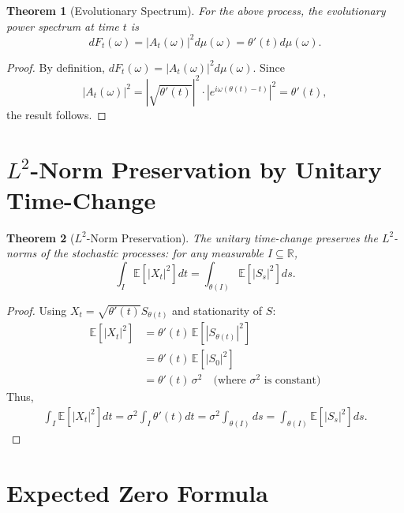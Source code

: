 \documentclass[11pt]{article}
\newtheorem{theorem}{Theorem}
\begin{document}
\begin{theorem}[Evolutionary Spectrum]\label{thm:evolve}
For the above process, the evolutionary power spectrum at time $t$ is
\begin{equation}
    dF_t(\omega) = |A_t(\omega)|^2 d\mu(\omega) = \theta'(t) d\mu(\omega).
\end{equation}
\end{theorem}

\begin{proof}
By definition, $dF_t(\omega) = |A_t(\omega)|^2 d\mu(\omega)$. Since 
\[
|A_t(\omega)|^2 = |\sqrt{\theta'(t)}|^2 \cdot |e^{i\omega(\theta(t)-t)}|^2 = \theta'(t),
\]
the result follows.
\end{proof}

\section{\texorpdfstring{$L^2$}{L2}-Norm Preservation by Unitary Time-Change}

\begin{theorem}[$L^2$-Norm Preservation]\label{thm:L2}
The unitary time-change preserves the $L^2$-norms of the stochastic processes: for any measurable $I\subseteq\mathbb{R}$,
\begin{equation}
    \int_I \mathbb{E}\left[|X_t|^2\right]dt = \int_{\theta(I)} \mathbb{E}\left[|S_s|^2\right]ds.
\end{equation}
\end{theorem}

\begin{proof}
Using $X_t = \sqrt{\theta'(t)} S_{\theta(t)}$ and stationarity of $S$:
\begin{align*}
    \mathbb{E}[|X_t|^2] &= \theta'(t)\,\mathbb{E}[|S_{\theta(t)}|^2]\\
    &= \theta'(t)\,\mathbb{E}[|S_0|^2]\\
    &= \theta'(t)\,\sigma^2 \quad\text{(where $\sigma^2$ is constant)}
\end{align*}
Thus,
\begin{align*}
    \int_I \mathbb{E}[|X_t|^2]dt = \sigma^2 \int_I \theta'(t) dt = \sigma^2 \int_{\theta(I)} ds = \int_{\theta(I)} \mathbb{E}[|S_s|^2] ds.
\end{align*}
\end{proof}

\section{Expected Zero Formula}
\end{document}
